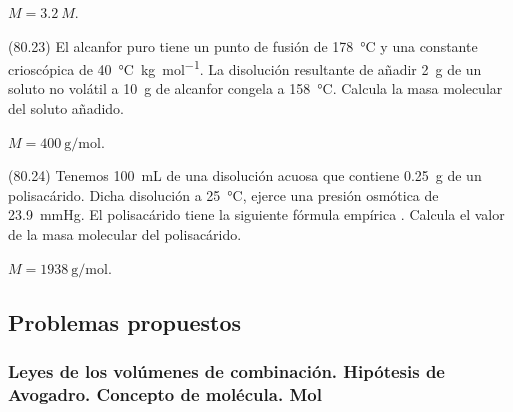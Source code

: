     \begin{solution}
      \( M = \SI{3.2}{M} \).
    \end{solution}




    \begin{exercise}[
        tags    = {},
        topics  = {química,química básica},
        source  = {FQ 1B MGH 2016, p80, e23},
      ]
      (80.23) El alcanfor puro tiene un punto de fusión de \SI{178}{\celsius} y una constante crioscópica de \SI{40}{\celsius\kilo\gram\per\mole}. La disolución resultante de añadir \SI{2}{\gram} de un soluto no volátil a
      \SI{10}{\gram} de alcanfor congela a \SI{158}{\celsius}. Calcula la masa molecular del soluto añadido.
    \end{exercise}

    \begin{solution}
      \( M = \SI{400}{\gram\per\mole} \).
    \end{solution}




    \begin{exercise}[
        tags    = {},
        topics  = {química,química básica},
        source  = {FQ 1B MGH 2016, p80, e24},
      ]
      (80.24) Tenemos \SI{100}{\milli\liter} de una disolución acuosa que contiene \SI{0.25}{\gram} de un polisacárido. Dicha disolución a \SI{25}{\celsius}, ejerce una presión osmótica de \SI{23.9}{\mmHg}. El polisacárido tiene la siguiente fórmula empírica . Calcula el valor de la masa molecular del polisacárido.
    \end{exercise}

    \begin{solution}
      \( M = \SI{1938}{\gram\per\mole} \).
    \end{solution}







  \subsection*{Problemas propuestos}

    \subsubsection*{Leyes de los volúmenes de combinación. Hipótesis de Avogadro. Concepto de molécula. Mol}

